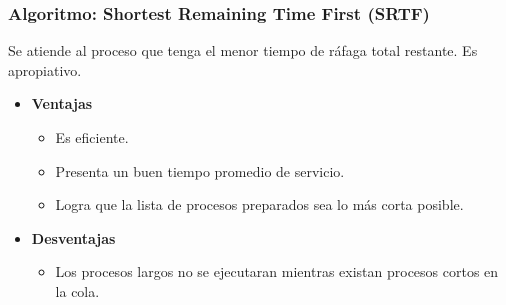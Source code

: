 \documentclass{beamer}
\newcommand{\algTitle}{\textbf{Algoritmo}: }
\begin{document}
\begin{frame}
\frametitle{\algTitle Shortest Remaining Time First (SRTF)}
Se atiende al proceso que tenga el menor tiempo de ráfaga total restante. Es apropiativo.

\begin{itemize}
	\item \textbf{Ventajas}
	\begin{itemize}
		\item Es eficiente.
		\item Presenta un buen tiempo promedio de servicio.
		\item Logra que la lista de procesos preparados sea lo más corta posible. 
	\end{itemize}
	\vspace{0.5cm}
	
	\item \textbf{Desventajas}
	\begin{itemize}
		\item Los procesos largos no se ejecutaran mientras existan procesos cortos 
		en la cola.
	\end{itemize}
\end{itemize}
\end{frame}
\end{document}
